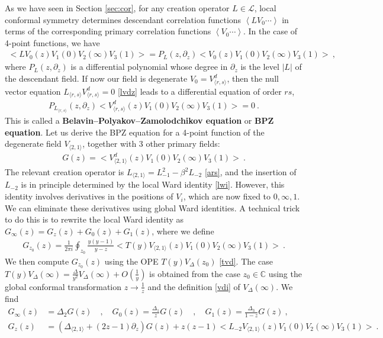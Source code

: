 \documentclass[12pt, a4paper]{article}
\theoremstyle{break}
\begin{document}
As we have seen in Section \ref{sec:cor}, for any creation operator $L\in\mathcal{L}$, local conformal symmetry determines descendant correlation functions $\left<LV_0\cdots \right>$ in terms of the corresponding primary correlation functions $\left<V_0\cdots \right>$.
In the case of 4-point functions, we have 
\begin{align}
 \Big<LV_0(z)V_1(0)V_2(\infty)V_3(1)\Big> = P_L(z,\partial_z) \Big<V_0(z)V_1(0)V_2(\infty)V_3(1)\Big>\ ,
\end{align}
where $P_L(z,\partial_z)$ is a differential polynomial whose degree in $\partial_z$ is the level $|L|$ of the descendant field. If now our field is degenerate $V_0= V^d_{\langle r,s\rangle}$, then the null vector equation $L_{\langle r,s\rangle}V^d_{\langle r,s\rangle}=0$ \eqref{lvdz} leads to a differential equation of order $rs$,
\begin{align}
 P_{L_{\langle r,s\rangle}}(z,\partial_z) \Big<V^d_{\langle r,s\rangle}(z)V_1(0)V_2(\infty)V_3(1)\Big> = 0\ .
\end{align}
This is called a \textbf{Belavin--Polyakov--Zamolodchikov equation} or \textbf{BPZ equation}.  
Let us derive the BPZ equation for a 4-point function  of the degenerate field $V_{\langle 2,1\rangle}$, together with 3 other primary fields:
\begin{align}
 G(z)=\Big<V_{\langle 2,1\rangle}^d(z)V_{1}(0)V_{2}(\infty)V_{3}(1)\Big>\ .
 \label{goz}
\end{align}
The relevant creation operator is $L_{\langle 2,1\rangle} = L_{-1}^2 -\beta^2L_{-2}$ \eqref{ars}, and the insertion of $L_{-2}$ is in principle determined by the local Ward identity \eqref{lwi}. However, this identity involves derivatives in the positions of $V_{i}$, which are now fixed to $0,\infty,1$. We can eliminate these derivatives using global Ward identities. A technical trick to do this is to rewrite the local Ward identity as $G_\infty(z) = G_{z}(z) + G_0(z) + G_1(z)$, where we define
\begin{align}
 G_{z_0}(z) = \frac{1}{2\pi i} \oint_{z_0} \frac{y(y-1)}{y-z} \Big< T(y)V_{\langle 2,1\rangle}(z)V_{1}(0)V_{2}(\infty)V_{3}(1)\Big> \ .
\end{align}
We then compute $G_{z_0}(z)$ using the OPE $T(y)V_\Delta(z_0)$ \eqref{tvd}. The case $T(y)V_\Delta(\infty) = \frac{\Delta}{y^2} V_\Delta(\infty) + O(\frac{1}{y})$ is obtained from the case $z_0\in\mathbb{C}$ using the global conformal transformation $z\to \frac{1}{z}$ and the definition \eqref{vdi} of $V_\Delta(\infty)$. We find 
\begin{align}
 G_\infty(z) &= \Delta_2 G(z) \quad , \quad G_0(z) = \frac{\Delta_1}{z}G(z)\quad , \quad G_1(z) = \frac{\Delta_3}{1-z}G(z)\ ,
 \\
 G_z(z) &= \left(\Delta_{\langle 2,1\rangle} + (2z-1)\partial_z\right) G(z) + z(z-1)\Big<L_{-2}V_{\langle 2,1\rangle}(z)V_{1}(0)V_{2}(\infty)V_{3}(1)\Big>
 \ .
\end{align}
\end{document}
